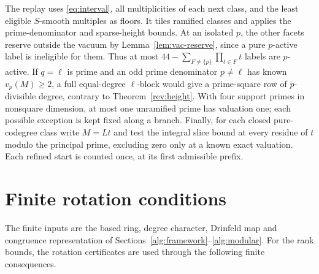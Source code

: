 \documentclass[11pt]{amsart}
\numberwithin{equation}{section}
\theoremstyle{definition}
\theoremstyle{plain}
\begin{document}
The replay uses \eqref{eq:interval}, all multiplicities of each next
class, and the least eligible $S$-smooth multiples as floors. It
tiles ramified classes and applies the prime-denominator and
sparse-height bounds. At an isolated $p$, the other facets reserve
outside the vacuum by Lemma~\ref{lem:vac-reserve}, since a pure
$p$-active label is ineligible for them. Thus at most
$44-\sum_{F\ne\{p\}}\prod_{t\in F}t$ labels are $p$-active.
If $q=\ell$ is prime and an odd prime denominator $p\ne\ell$ has known
$v_p(M)\ge2$, a full equal-degree $\ell$-block would give a prime-square
row of $p$-divisible degree, contrary to Theorem~\ref{rev:height}.
With four support primes in nonsquare dimension, at most one
unramified prime has valuation one; each possible exception is kept
fixed along a branch. Finally, for each closed pure-codegree class
write $M=Lt$ and test the integral slice bound at every residue of
$t$ modulo the principal prime, excluding zero only at a known
exact valuation. Each refined start is counted once, at its first
admissible prefix.

\section{Finite rotation conditions}\label{formal:lean}\label{formal:finite}

The finite inputs are the based ring, degree character, Drinfeld map
and congruence representation of Sections~\ref{alg:framework}--\ref{alg:modular}.
For the rank bounds, the rotation certificates are used through the
following finite consequences.
\end{document}
